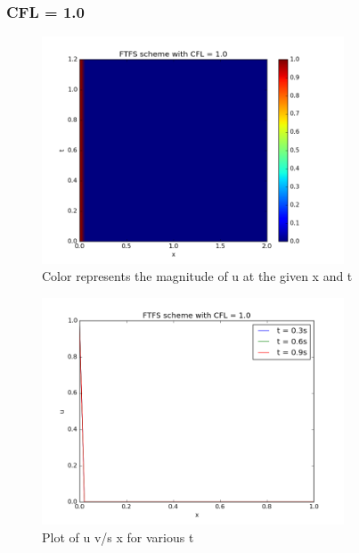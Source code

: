 \documentclass[11pt, a4paper]{article}
\begin{document}
\subsubsection{CFL = 1.0}
\begin{figure}[H]
 \centering
 \includegraphics[width = 0.8\textwidth]{FTFS1_1.png}
 \caption{Color represents the magnitude of u at the given x and t}
\end{figure}

\begin{figure}[H]
 \centering
 \includegraphics[width = 0.8\textwidth]{FTFS1_1_1.png}
 \caption{Plot of u v/s x for various t}
\end{figure}
\end{document}
